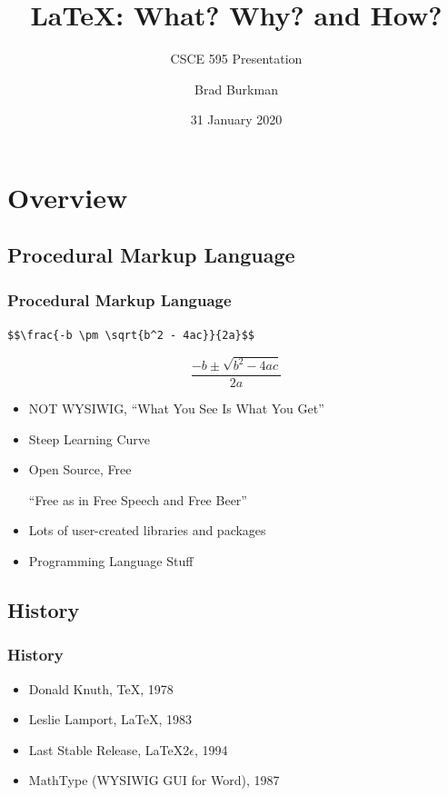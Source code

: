 \documentclass{beamer}
\title{\LaTeX: What? Why? and How?}
\subtitle{CSCE 595 Presentation}
\author{Brad Burkman}
\institute[LSMSA]{Louisiana School for Math, Science, and the Arts}
\date{31 January 2020}
\begin{document}
\newcommand{\nologo}{\setbeamertemplate{logo}{}} 


\begin{frame}[t]
	\Large
	\maketitle
\end{frame}

\begin{frame}[t]
	\Large
	\tableofcontents[hideallsubsections]
\end{frame}



\section{Overview}

\subsection{Procedural Markup Language}
\begin{frame}[t, fragile]
	\frametitle{Procedural Markup Language}
\Large


\verb|$$\frac{-b \pm \sqrt{b^2 - 4ac}}{2a}$$|

$$\frac{-b \pm \sqrt{b^2 - 4ac}}{2a}$$

\begin{itemize}
	\item NOT WYSIWIG, ``What You See Is What You Get''
	\item Steep Learning Curve
	\item Open Source, Free
	
	``Free as in Free Speech and Free Beer''
	\item Lots of user-created libraries and packages
	\item Programming Language Stuff
\end{itemize} 
\end{frame}

\subsection{History}
\begin{frame}[t]
	\frametitle{History}
\Large

\begin{itemize}
	\item Donald Knuth, \TeX, 1978
	\item Leslie Lamport, \LaTeX, 1983
	\item Last Stable Release, \LaTeX2$\epsilon$, 1994
	\item MathType (WYSIWIG GUI for Word), 1987
\end{itemize}

\end{frame}
\end{document}
